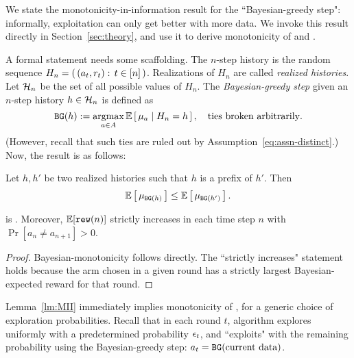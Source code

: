 




We state the monotonicity-in-information result for the ``Bayesian-greedy step": informally, exploitation can only get better with more data.  We invoke this result directly in Section~\ref{sec:theory}, and use it to derive monotonicity of \DynGreedy and \DynamicEpsGreedy.

A formal statement needs some scaffolding. The $n$-step history is the random sequence
    $H_n = \left(\, (a_t,r_t):\, t\in[n]\,\right)$.
Realizations of $H_n$ are called \emph{realized histories}.
Let $\mathcal{H}_n$ be the set of all possible values of $H_n$. The \emph{Bayesian-greedy step} given an $n$-step history $h\in \mathcal{H}_n$ is defined as
\[ \DG(h) := \argmax_{a\in A} \E\sbr{ \mu_a\mid H_n = h },
\quad\text{ties broken arbitrarily}.\]
(However, recall that such ties are ruled out by Assumption~\ref{eq:assn-distinct}.) Now, the result is as follows:

\begin{lemma}\label{lm:MII}
Let $h,h'$ be two realized histories such that $h$ is a prefix of $h'$. Then
\[ \E\sbr{ \mu_{\DG(h)} } \leq \E\sbr{ \mu_{\DG(h')} }. \]
\end{lemma}

\begin{corollary}\label{dgmono}
\DynGreedy is \bmonotone. Moreover,
$\E[\rew(n)]$ strictly increases in each time step $n$ with $\Pr[a_n\neq a_{n+1}]>0$.
\end{corollary}

\begin{proof}
Bayesian-monotonicity follows directly. The ``strictly increases" statement holds because the arm chosen in a given round has a strictly largest Bayesian-expected reward for that round.
\end{proof}

 Lemma~\ref{lm:MII} immediately implies monotonicity of \DynamicEpsGreedy, for a generic choice of exploration probabilities. Recall that in each round $t$, \DynamicEpsGreedy algorithm explores uniformly with a predetermined probability $\epsilon_t$, and ``exploits" with the remaining probability using the Bayesian-greedy step:
    $a_t = \mathtt{BG}(\text{current data})$.


